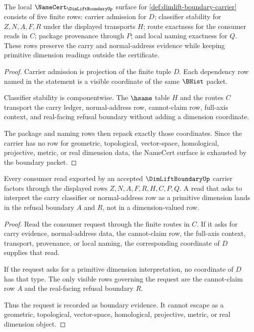 \begin{theorem}
\label{thm:dimlift-boundary-namecert-obligations}
The local $\NameCert_{\DimLiftBoundaryUp}$ surface for \autoref{def:dimlift-boundary-carrier} consists of five finite rows: carrier admission for $D$; classifier stability for $Z,N,A,F,R$ under the displayed transports $H$; route exactness for the consumer reads in $C$; package provenance through $P$; and local naming exactness for $Q$. These rows preserve the carry and normal-address evidence while keeping primitive dimension readings outside the certificate.
\end{theorem}
\begin{proof}
Carrier admission is projection of the finite tuple $D$. Each dependency row named in the statement is a visible coordinate of the same $\BHist$ packet.

Classifier stability is componentwise. The $\hsame$ table $H$ and the routes $C$ transport the carry ledger, normal-address row, cannot-claim row, full-axis context, and real-facing refusal boundary without adding a dimension coordinate.

The package and naming rows then repack exactly those coordinates. Since the carrier has no row for geometric, topological, vector-space, homological, projective, metric, or real dimension data, the NameCert surface is exhausted by the boundary packet.
\end{proof}

\begin{theorem}
\label{thm:dimlift-boundary-non-escape}
Every consumer read exported by an accepted $\DimLiftBoundaryUp$ carrier factors through the displayed rows $Z,N,A,F,R,H,C,P,Q$. A read that asks to interpret the carry classifier or normal-address row as a primitive dimension lands in the refusal boundary $A$ and $R$, not in a dimension-valued row.
\end{theorem}
\begin{proof}
Read the consumer request through the finite routes in $C$. If it asks for carry evidence, normal-address data, the cannot-claim row, the full-axis context, transport, provenance, or local naming, the corresponding coordinate of $D$ supplies that read.

If the request asks for a primitive dimension interpretation, no coordinate of $D$ has that type. The only visible rows governing the request are the cannot-claim row $A$ and the real-facing refusal boundary $R$.

Thus the request is recorded as boundary evidence. It cannot escape as a geometric, topological, vector-space, homological, projective, metric, or real dimension object.
\end{proof}

